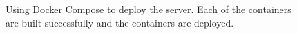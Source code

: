 \begin{figure}[H]
  \centering
  \caption[Server Terminal Output 2]{Using Docker Compose to deploy the server. Each of the containers are built successfully and the containers are deployed.}
  \label{fig:server-terminal-2}
\end{figure}



